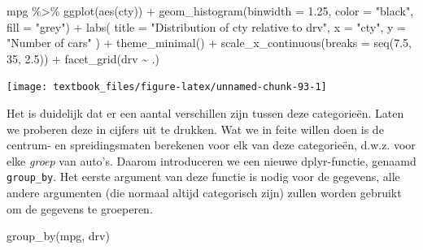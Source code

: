 \documentclass[]{tufte-book}
\newenvironment{Shaded}{}{}
\newcommand{\AttributeTok}[1]{\textcolor[rgb]{0.49,0.56,0.16}{#1}}
\newcommand{\DecValTok}[1]{\textcolor[rgb]{0.25,0.63,0.44}{#1}}
\newcommand{\FloatTok}[1]{\textcolor[rgb]{0.25,0.63,0.44}{#1}}
\newcommand{\FunctionTok}[1]{\textcolor[rgb]{0.02,0.16,0.49}{#1}}
\newcommand{\NormalTok}[1]{#1}
\newcommand{\SpecialCharTok}[1]{\textcolor[rgb]{0.25,0.44,0.63}{#1}}
\newcommand{\StringTok}[1]{\textcolor[rgb]{0.25,0.44,0.63}{#1}}
\begin{document}
\begin{Shaded}
\begin{Highlighting}[]
\NormalTok{mpg }\SpecialCharTok{\%\textgreater{}\%}
  \FunctionTok{ggplot}\NormalTok{(}\FunctionTok{aes}\NormalTok{(cty)) }\SpecialCharTok{+}
  \FunctionTok{geom\_histogram}\NormalTok{(}\AttributeTok{binwidth =} \FloatTok{1.25}\NormalTok{, }\AttributeTok{color =} \StringTok{"black"}\NormalTok{, }\AttributeTok{fill =} \StringTok{"grey"}\NormalTok{) }\SpecialCharTok{+}
  \FunctionTok{labs}\NormalTok{(}
    \AttributeTok{title =} \StringTok{"Distribution of cty relative to drv"}\NormalTok{,}
    \AttributeTok{x =} \StringTok{"cty"}\NormalTok{,}
    \AttributeTok{y =} \StringTok{"Number of cars"}
\NormalTok{  ) }\SpecialCharTok{+}
  \FunctionTok{theme\_minimal}\NormalTok{() }\SpecialCharTok{+}
  \FunctionTok{scale\_x\_continuous}\NormalTok{(}\AttributeTok{breaks =} \FunctionTok{seq}\NormalTok{(}\FloatTok{7.5}\NormalTok{, }\DecValTok{35}\NormalTok{, }\FloatTok{2.5}\NormalTok{)) }\SpecialCharTok{+}
  \FunctionTok{facet\_grid}\NormalTok{(drv }\SpecialCharTok{\textasciitilde{}}\NormalTok{ .)}
\end{Highlighting}
\end{Shaded}

\texttt{[image: textbook\_files/figure-latex/unnamed-chunk-93-1]}

Het is duidelijk dat er een aantal verschillen zijn tussen deze categorieën. Laten we proberen deze in cijfers uit te drukken. Wat we in feite willen doen is de centrum- en spreidingsmaten berekenen voor elk van deze categorieën, d.w.z. voor elke \emph{groep} van auto's. Daarom introduceren we een nieuwe dplyr-functie, genaamd \texttt{group\_by}. Het eerste argument van deze functie is nodig voor de gegevens, alle andere argumenten (die normaal altijd categorisch zijn) zullen worden gebruikt om de gegevens te groeperen.

\begin{Shaded}
\begin{Highlighting}[]
\FunctionTok{group\_by}\NormalTok{(mpg, drv)}
\end{Highlighting}
\end{Shaded}
\end{document}
